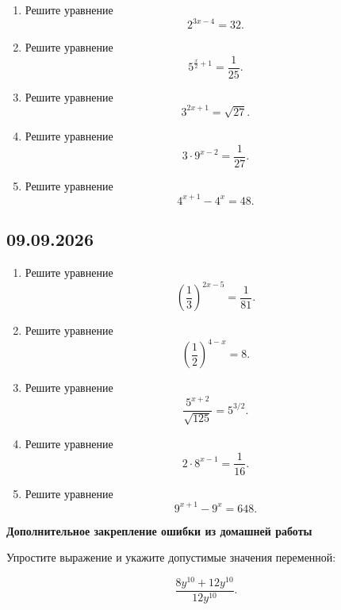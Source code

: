 \documentclass[a4paper,12pt]{article}
\begin{document}
\begin{enumerate}[label=\textbf{\arabic*)}]

  \item Решите уравнение
  \[
  2^{3x-4}=32.
  \]

  \item Решите уравнение
  \[
  5^{\frac{x}{2}+1}=\frac1{25}.
  \]

  \item Решите уравнение
  \[
  3^{2x+1}=\sqrt{27}.
  \]

  \item Решите уравнение
  \[
  3\cdot9^{x-2}=\frac1{27}.
  \]

  \item Решите уравнение
  \[
  4^{x+1}-4^x=48.
  \]

\end{enumerate}


\subsection*{09.09.2026}

\begin{enumerate}[label=\textbf{\arabic*)},start=6]

  \item Решите уравнение
  \[
  \left(\frac13\right)^{2x-5}
  =
  \frac1{81}.
  \]

  \item Решите уравнение
  \[
  \left(\frac12\right)^{4-x}=8.
  \]

  \item Решите уравнение
  \[
  \frac{5^{x+2}}{\sqrt{125}}
  =
  5^{3/2}.
  \]

  \item Решите уравнение
  \[
  2\cdot8^{x-1}
  =
  \frac1{16}.
  \]

  \item Решите уравнение
  \[
  9^{x+1}-9^x=648.
  \]

\end{enumerate}

\vspace{1em}

\textbf{Дополнительное закрепление ошибки из домашней работы}

Упростите выражение и укажите допустимые значения переменной:

\[
\frac{8y^{10}+12y^{10}}{12y^{10}}.
\]
\end{document}
